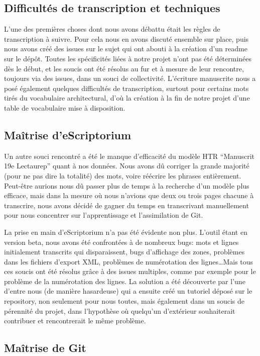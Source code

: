 \documentclass{article}
\begin{document}
\subsection{Difficultés de transcription et techniques}
L'une des premières choses dont nous avons débattu était les règles de transcription à suivre. Pour cela nous en avons discuté ensemble sur place, puis nous avons créé des issues sur le sujet qui ont abouti à la création d’un readme sur le dépôt. Toutes les spécificités liées à notre projet n’ont pas été déterminées dès le début, et les soucis ont été résolus au fur et à mesure de leur rencontre, toujours via des issues, dans un souci de collectivité. L’écriture manuscrite nous a posé également quelques difficultés de transcription, surtout pour certains mots tirés du vocabulaire architectural, d’où la création à la fin de notre projet d’une table de vocabulaire mise à disposition. 



\subsection{Maîtrise d'eScriptorium}
Un autre souci rencontré a été le manque d’efficacité du modèle HTR “Manuscrit 19e Lectaurep” quant à nos données. Nous avons dû corriger la grande majorité (pour ne pas dire la totalité) des mots, voire réécrire les phrases entièrement. Peut-être aurions nous dû passer plus de temps à la recherche d’un modèle plus efficace, mais dans la mesure où nous n’avions que deux ou trois pages chacune à transcrire, nous avons décidé de gagner du temps en transcrivant manuellement pour nous concentrer sur l’apprentissage et l’assimilation de Git.

La prise en main d’eScriptorium n’a pas été évidente non plus. L’outil étant en version beta, nous avons été confrontées à de nombreux bugs: mots et lignes initialement transcrits qui disparaissent, bugs d’affichage des zones, problèmes dans les fichiers d’export XML, problèmes de numérotation des lignes…Mais tous ces soucis ont été résolus grâce à des issues multiples, comme par exemple pour le problème de la numérotation des lignes. La solution a été découverte par l’une d’entre nous (de manière hasardeuse) qui a ensuite créé un tutoriel déposé sur le repository, non seulement pour nous toutes, mais également dans un soucis de pérennité du projet, dans l’hypothèse où quelqu’un d’extérieur souhaiterait contribuer et rencontrerait le même problème.


\subsection{Maîtrise de Git}
\end{document}
